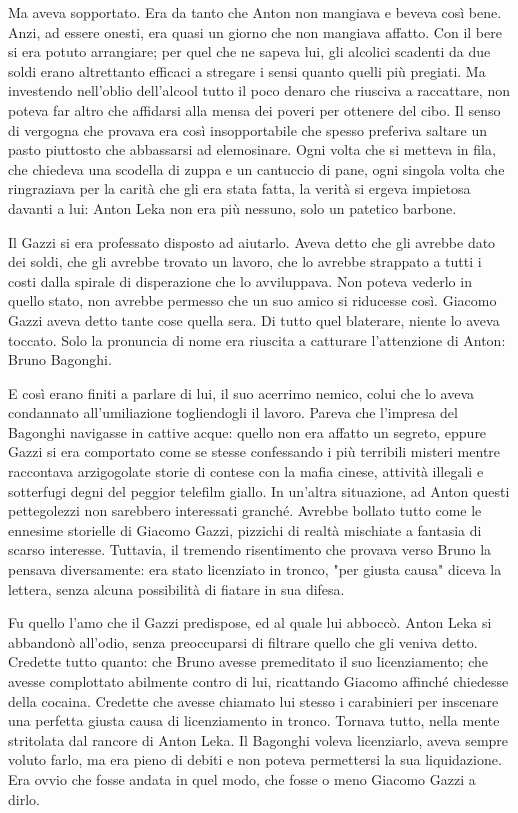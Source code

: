 Ma aveva sopportato. Era da tanto che Anton non mangiava e beveva così bene. Anzi, ad essere onesti, era quasi un giorno che non mangiava affatto. Con il bere si era potuto arrangiare; per quel che ne sapeva lui, gli alcolici scadenti da due soldi erano altrettanto efficaci a stregare i sensi quanto quelli più pregiati. Ma investendo nell'oblio dell'alcool tutto il poco denaro che riusciva a raccattare, non poteva far altro che affidarsi alla mensa dei poveri per ottenere del cibo. Il senso di vergogna che provava era così insopportabile che spesso preferiva saltare un pasto piuttosto che abbassarsi ad elemosinare. Ogni volta che si metteva in fila, che chiedeva una scodella di zuppa e un cantuccio di pane, ogni singola volta che ringraziava per la carità che gli era stata fatta, la verità si ergeva impietosa davanti a lui: Anton Leka non era più nessuno, solo un patetico barbone.

Il Gazzi si era professato disposto ad aiutarlo. Aveva detto che gli avrebbe dato dei soldi, che gli avrebbe trovato un lavoro, che lo avrebbe strappato a tutti i costi dalla spirale di disperazione che lo avviluppava. Non poteva vederlo in quello stato, non avrebbe permesso che un suo amico si riducesse così. Giacomo Gazzi aveva detto tante cose quella sera. Di tutto quel blaterare, niente lo aveva toccato. Solo la pronuncia di nome era riuscita a catturare l'attenzione di Anton: Bruno Bagonghi.

E così erano finiti a parlare di lui, il suo acerrimo nemico, colui che lo aveva condannato all'umiliazione togliendogli il lavoro. Pareva che l'impresa del Bagonghi navigasse in cattive acque: quello non era affatto un segreto, eppure Gazzi si era comportato come se stesse confessando i più terribili misteri mentre raccontava arzigogolate storie di contese con la mafia cinese, attività illegali e sotterfugi degni del peggior telefilm giallo. In un'altra situazione, ad Anton questi pettegolezzi non sarebbero interessati granché. Avrebbe bollato tutto come le ennesime storielle di Giacomo Gazzi, pizzichi di realtà mischiate a fantasia di scarso interesse. Tuttavia, il tremendo risentimento che provava verso Bruno la pensava diversamente: era stato licenziato in tronco, "per giusta causa" diceva la lettera, senza alcuna possibilità di fiatare in sua difesa.

Fu quello l'amo che il Gazzi predispose, ed al quale lui abboccò. Anton Leka si abbandonò all'odio, senza preoccuparsi di filtrare quello che gli veniva detto. Credette tutto quanto: che Bruno avesse premeditato il suo licenziamento; che avesse complottato abilmente contro di lui, ricattando Giacomo affinché chiedesse della cocaina. Credette che avesse chiamato lui stesso i carabinieri per inscenare una perfetta giusta causa di licenziamento in tronco. Tornava tutto, nella mente stritolata dal rancore di Anton Leka. Il Bagonghi voleva licenziarlo, aveva sempre voluto farlo, ma era pieno di debiti e non poteva permettersi la sua liquidazione. Era ovvio che fosse andata in quel modo, che fosse o meno Giacomo Gazzi a dirlo.

